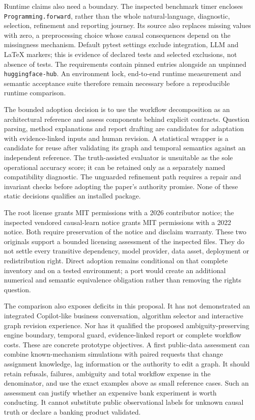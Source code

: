 Runtime claims also need a boundary. The inspected benchmark timer encloses
\texttt{Programming.forward}, rather than the whole natural-language,
diagnostic, selection, refinement and reporting journey. Its source also
replaces missing values with zero, a preprocessing choice whose causal
consequences depend on the missingness mechanism. Default pytest settings
exclude integration, LLM and LaTeX markers; this is evidence of declared tests
and selected exclusions, not absence of tests. The requirements contain pinned
entries alongside an unpinned \texttt{huggingface-hub}. An environment lock,
end-to-end runtime measurement and semantic acceptance suite therefore remain
necessary before a reproducible runtime comparison.
\citep{exec17_copilot_code}

The bounded adoption decision is to use the workflow decomposition as an
architectural reference and assess components behind explicit contracts.
Question parsing, method explanations and report drafting are candidates for
adaptation with evidence-linked inputs and human revision. A statistical
wrapper is a candidate for reuse after validating its graph and temporal
semantics against an independent reference. The truth-assisted evaluator is
unsuitable as the sole operational accuracy score; it can be retained only as
a separately named compatibility diagnostic. The unguarded refinement path
requires a repair and invariant checks before adopting the paper's authority
promise. None of these static decisions qualifies an installed package.
\citep{exec17_copilot_code,exec17_copilot_exact}

The root license grants MIT permissions with a 2026 contributor notice; the
inspected vendored causal-learn notice grants MIT permissions with a 2022
notice. Both require preservation of the notice and disclaim warranty. These
two originals support a bounded licensing assessment of the inspected files.
They do not settle every transitive dependency, model provider, data asset,
deployment or redistribution right. Direct adoption remains conditional on
that complete inventory and on a tested environment; a port would create an
additional numerical and semantic equivalence obligation rather than removing
the rights question.\citep{exec17_copilot_rights}

The comparison also exposes deficits in this proposal. It has not demonstrated
an integrated Copilot-like business conversation, algorithm selector and
interactive graph revision experience. Nor has it qualified the proposed
ambiguity-preserving engine boundary, temporal guard, evidence-linked report
or complete workflow costs. These are concrete prototype objectives. A first
public-data assessment can combine known-mechanism simulations with paired
requests that change assignment knowledge, lag information or the authority
to edit a graph. It should retain refusals, failures, ambiguity and total
workflow expense in the denominator, and use the exact examples above as
small reference cases. Such an assessment can justify whether an expensive
bank experiment is worth conducting. It cannot substitute public observational
labels for unknown causal truth or declare a banking product validated.
\label{exec17:copilot-development-end}
